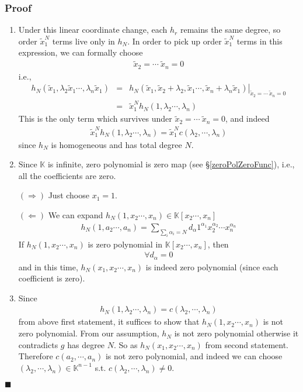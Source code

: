\documentclass[11pt]{book}
\begin{document}
\subsubsection{Proof}
\begin{enumerate}
\item 
Under this linear coordinate change, each $h_r$ remains the same degree, so order $\tilde{x}_1^{N}$ terms live only in $h_N$.
In order to pick up order $\tilde{x}_1^{N}$ terms in this expression, we can formally choose
\begin{eqnarray}
\tilde{x}_2 = \cdots \ \tilde{x}_{n} = 0
\end{eqnarray}
i.e.,
\begin{eqnarray}
\nonumber
h_N(\tilde{x}_1, \lambda_2 \tilde{x}_1 \cdots, \lambda_n \tilde{x}_1) 
&=& \left. h_N(\tilde{x}_1,\tilde{x}_2 + \lambda_2, \tilde{x}_1 \cdots,  \tilde{x}_n + \lambda_n \tilde{x}_1 ) \right|_{\tilde{x}_2 = \cdots \ \tilde{x}_{n} = 0} \\
&=& \tilde{x}_1^N h_N(1, \lambda_2 \cdots, \lambda_n) 
\end{eqnarray}
This is the only term which survives under $\tilde{x}_2 = \cdots \ \tilde{x}_{n} = 0$, and indeed
\begin{eqnarray}
\tilde{x}_1^N h_N(1, \lambda_2 \cdots, \lambda_n) = \tilde{x}_1^N c(\lambda_2, \cdots, \lambda_n)
\end{eqnarray}
since $h_N$ is homogeneous and has total degree $N$.

\item
Since $\mathbb{K}$ is infinite, zero polynomial is zero map (see \S\ref{zeroPolZeroFunc}), i.e., all the coefficients are zero.

$(\Rightarrow)$ Just choose $x_1 = 1$.

$(\Leftarrow)$
We can expand $h_N(1, x_2 \cdots, x_n) \in \mathbb{K}[x_2 \cdots, x_n]$
\begin{eqnarray}
h_N(1, a_2 \cdots, a_n) =  \sum_{\sum_i \alpha_i = N} d_{\alpha} 1^{\alpha_1} x_2^{\alpha_2} \cdots x_n^{\alpha_n} 
\end{eqnarray}
If $h_N(1, x_2 \cdots, x_n)$ is zero polynomial in $\mathbb{K}[x_2 \cdots, x_n]$, then 
\begin{eqnarray}
\forall d_\alpha = 0
\end{eqnarray}
and in this time, $h_N(x_1, x_2 \cdots, x_n)$ is indeed zero polynomial (since each coefficient is zero).

\item
Since
\begin{eqnarray}
h_N(1, \lambda_2 \cdots, \lambda_n) = c(\lambda_2, \cdots, \lambda_n)
\end{eqnarray}
from above first statement, it suffices to show that $h_N(1, x_2 \cdots, x_n)$ is not zero polynomial.
From our assumption, $h_N$ is not zero polynomial otherwise it contradicts $g$ has degree $N$.
So as $h_N(x_1, x_2 \cdots, x_n)$ from second statement.
Therefore $c(a_2, \cdots, a_n)$ is not zero polynomial, and indeed we can choose $(\lambda_2, \cdots, \lambda_n) \in \mathbb{K}^{n-1}$ s.t. $c(\lambda_2, \cdots, \lambda_n) \neq 0$. 
\end{enumerate}
$\blacksquare$
\end{document}
